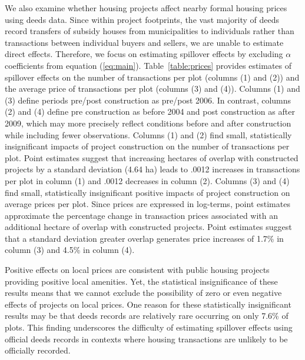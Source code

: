 \documentclass[12pt]{article}
\begin{document}
We also examine whether housing projects affect nearby formal housing prices using deeds data.  Since within project footprints, the vast majority of deeds record transfers of subsidy houses from municipalities to individuals rather than transactions between individual buyers and sellers, we are unable to estimate direct effects.  Therefore, we focus on estimating spillover effects by excluding $\alpha$ coefficients from equation (\ref{eq:main}).  Table~\ref{table:prices} provides estimates of spillover effects on the number of transactions per plot (columns (1) and (2)) and the average price of transactions per plot (columns (3) and (4)).  Columns (1) and (3) define periods pre/post construction as pre/post 2006.  In contrast, columns (2) and (4) define pre construction as before 2004 and post construction as after 2009, which may more precisely reflect conditions before and after construction while including fewer observations.  Columns (1) and (2) find small, statistically insignificant impacts of project construction on the number of transactions per plot.  Point estimates suggest that increasing hectares of overlap with constructed projects by a standard deviation (4.64 ha) leads to .0012 increases in transactions per plot in column (1) and .0012 decreases in column (2).  Columns (3) and (4) find small, statistically insignificant positive impacts of project construction on average prices per plot.  Since prices are expressed in log-terms, point estimates approximate the percentage change in transaction prices associated with an additional hectare of overlap with constructed projects.  Point estimates suggest that a standard deviation greater overlap generates price increases of 1.7\% in column (3) and 4.5\% in column (4).  

Positive effects on local prices are consistent with public housing projects providing positive local amenities.  Yet, the statistical insignificance of these results means that we cannot exclude the possibility of zero or even negative effects of projects on local prices.  One reason for these statistically insignificant results may be that deeds records are relatively rare occurring on only 7.6\% of plots.  This finding underscores the difficulty of estimating spillover effects using official deeds records in contexts where housing transactions are unlikely to be officially recorded.
\end{document}
